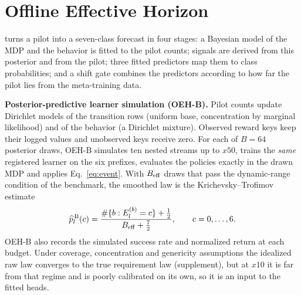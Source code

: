 \section{Offline Effective Horizon}
\label{sec:method}

\OEH{} turns a pilot into a seven-class forecast in four stages: a Bayesian model of the MDP and the behavior is fitted to the pilot counts; signals are derived from this posterior and from the pilot; three fitted predictors map them to class probabilities; and a shift gate combines the predictors according to how far the pilot lies from the meta-training data.

\textbf{Posterior-predictive learner simulation (OEH-B).} Pilot counts update Dirichlet models of the transition rows (uniform base, concentration by marginal likelihood) and of the behavior (a Dirichlet mixture). Observed reward keys keep their logged values and unobserved keys receive zero. For each of $B=64$ posterior draws, OEH-B simulates ten nested streams up to $x50$, trains the \emph{same} registered learner on the six prefixes, evaluates the policies exactly in the drawn MDP and applies Eq.~\eqref{eq:event}. With $B_{\rm eff}$ draws that pass the dynamic-range condition of the benchmark, the smoothed law is the Krichevsky--Trofimov estimate~\cite{krichevsky1981encoding}
\begin{equation}
\widehat p^{\,\rm B}_l(c)=\frac{\#\{b:E_l^{(b)}=c\}+\tfrac12}{B_{\rm eff}+\tfrac72},\qquad c=0,\ldots,6.
\label{eq:posterior}
\end{equation}
OEH-B also records the simulated success rate and normalized return at each budget. Under coverage, concentration and genericity assumptions the idealized raw law converges to the true requirement law (supplement), but at $x10$ it is far from that regime and is poorly calibrated on its own, so it is an input to the fitted heads.

